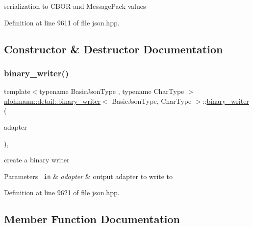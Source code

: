 serialization to C\+B\+OR and Message\+Pack values 

Definition at line 9611 of file json.\+hpp.



\subsection{Constructor \& Destructor Documentation}
\mbox{\label{classnlohmann_1_1detail_1_1binary__writer_a373289af95a946c19bb4a58a5df71a78}} 
\subsubsection{\texorpdfstring{binary\_writer()}{binary\_writer()}}
{\footnotesize\ttfamily template$<$typename Basic\+Json\+Type , typename Char\+Type $>$ \\
\mbox{\hyperlink{classnlohmann_1_1detail_1_1binary__writer}{nlohmann\+::detail\+::binary\+\_\+writer}}$<$ Basic\+Json\+Type, Char\+Type $>$\+::\mbox{\hyperlink{classnlohmann_1_1detail_1_1binary__writer}{binary\+\_\+writer}} (\begin{DoxyParamCaption}\item[{\mbox{\hyperlink{namespacenlohmann_1_1detail_a9b680ddfb58f27eb53a67229447fc556}{output\+\_\+adapter\+\_\+t}}$<$ Char\+Type $>$}]{adapter }\end{DoxyParamCaption})\hspace{0.3cm}{\ttfamily [inline]}, {\ttfamily [explicit]}}



create a binary writer 


\begin{DoxyParams}[1]{Parameters}
\mbox{\texttt{ in}}  & {\em adapter} & output adapter to write to \\
\hline
\end{DoxyParams}


Definition at line 9621 of file json.\+hpp.



\subsection{Member Function Documentation}
\mbox{\label{classnlohmann_1_1detail_1_1binary__writer_ab77aa48692bd4e64e4f051ce6aeb6d2d}} 
